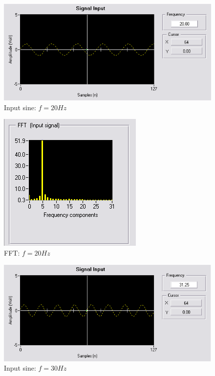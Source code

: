 \documentclass[a4paper, 12pt, titlepage]{article}
\begin{document}
\subsubsection{}
\begin{figure}[H]
\includegraphics[scale=0.7]{2input20hz.png}
\caption{Input sine: $f=20Hz$}
\end{figure}
\begin{figure}[H]
\includegraphics[scale=0.7]{2FFT20hz.png}
\caption{FFT: $f=20Hz$}
\end{figure}
\begin{figure}[H]
\includegraphics[scale=0.7]{2input30hz.png}
\caption{Input sine: $f=30Hz$}
\end{figure}
\end{document}
